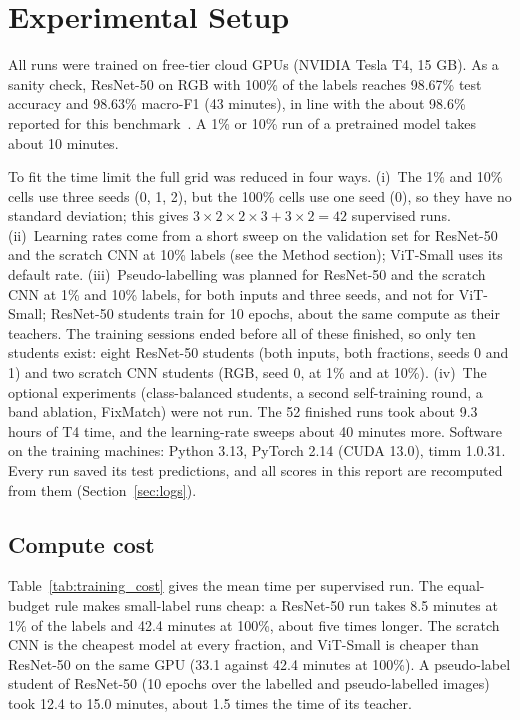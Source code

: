 \documentclass[conference]{IEEEtran}
\begin{document}
\section{Experimental Setup}\label{sec:setup}
All runs were trained on free-tier cloud GPUs (NVIDIA Tesla T4, 15 GB). As a sanity check, ResNet-50 on RGB with 100\% of the labels reaches 98.67\% test accuracy and 98.63\% macro-F1 (43 minutes), in line with the about 98.6\% reported for this benchmark~\cite{helber2019eurosat}. A 1\% or 10\% run of a pretrained model takes about 10 minutes.

To fit the time limit the full grid was reduced in four ways. (i)~The 1\% and 10\% cells use three seeds (0, 1, 2), but the 100\% cells use one seed (0), so they have no standard deviation; this gives $3\times2\times2\times3 + 3\times2 = 42$ supervised runs. (ii)~Learning rates come from a short sweep on the validation set for ResNet-50 and the scratch CNN at 10\% labels (see the Method section); ViT-Small uses its default rate. (iii)~Pseudo-labelling was planned for ResNet-50 and the scratch CNN at 1\% and 10\% labels, for both inputs and three seeds, and not for ViT-Small; ResNet-50 students train for 10 epochs, about the same compute as their teachers. The training sessions ended before all of these finished, so only ten students exist: eight ResNet-50 students (both inputs, both fractions, seeds 0 and 1) and two scratch CNN students (RGB, seed 0, at 1\% and at 10\%). (iv)~The optional experiments (class-balanced students, a second self-training round, a band ablation, FixMatch) were not run. The 52 finished runs took about 9.3 hours of T4 time, and the learning-rate sweeps about 40 minutes more. Software on the training machines: Python 3.13, PyTorch 2.14 (CUDA 13.0), timm 1.0.31. Every run saved its test predictions, and all scores in this report are recomputed from them (Section~\ref{sec:logs}).

\subsection{Compute cost}
Table~\ref{tab:training_cost} gives the mean time per supervised run. The equal-budget rule makes small-label runs cheap: a ResNet-50 run takes 8.5 minutes at 1\% of the labels and 42.4 minutes at 100\%, about five times longer. The scratch CNN is the cheapest model at every fraction, and ViT-Small is cheaper than ResNet-50 on the same GPU (33.1 against 42.4 minutes at 100\%). A pseudo-label student of ResNet-50 (10 epochs over the labelled and pseudo-labelled images) took 12.4 to 15.0 minutes, about 1.5 times the time of its teacher.
\end{document}
